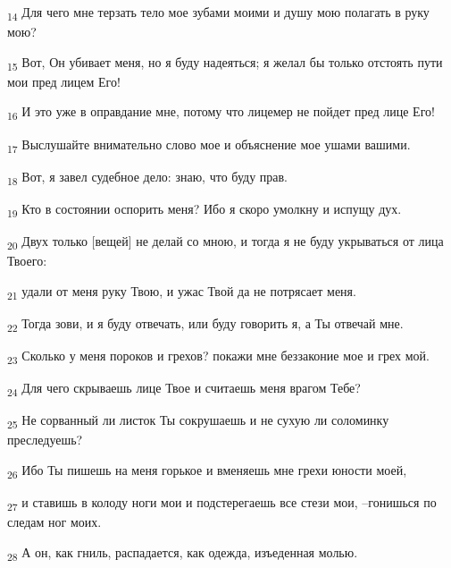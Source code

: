 \begin{tcolorbox}
\textsubscript{14} Для чего мне терзать тело мое зубами моими и душу мою полагать в руку мою?
\end{tcolorbox}
\begin{tcolorbox}
\textsubscript{15} Вот, Он убивает меня, но я буду надеяться; я желал бы только отстоять пути мои пред лицем Его!
\end{tcolorbox}
\begin{tcolorbox}
\textsubscript{16} И это уже в оправдание мне, потому что лицемер не пойдет пред лице Его!
\end{tcolorbox}
\begin{tcolorbox}
\textsubscript{17} Выслушайте внимательно слово мое и объяснение мое ушами вашими.
\end{tcolorbox}
\begin{tcolorbox}
\textsubscript{18} Вот, я завел судебное дело: знаю, что буду прав.
\end{tcolorbox}
\begin{tcolorbox}
\textsubscript{19} Кто в состоянии оспорить меня? Ибо я скоро умолкну и испущу дух.
\end{tcolorbox}
\begin{tcolorbox}
\textsubscript{20} Двух только [вещей] не делай со мною, и тогда я не буду укрываться от лица Твоего:
\end{tcolorbox}
\begin{tcolorbox}
\textsubscript{21} удали от меня руку Твою, и ужас Твой да не потрясает меня.
\end{tcolorbox}
\begin{tcolorbox}
\textsubscript{22} Тогда зови, и я буду отвечать, или буду говорить я, а Ты отвечай мне.
\end{tcolorbox}
\begin{tcolorbox}
\textsubscript{23} Сколько у меня пороков и грехов? покажи мне беззаконие мое и грех мой.
\end{tcolorbox}
\begin{tcolorbox}
\textsubscript{24} Для чего скрываешь лице Твое и считаешь меня врагом Тебе?
\end{tcolorbox}
\begin{tcolorbox}
\textsubscript{25} Не сорванный ли листок Ты сокрушаешь и не сухую ли соломинку преследуешь?
\end{tcolorbox}
\begin{tcolorbox}
\textsubscript{26} Ибо Ты пишешь на меня горькое и вменяешь мне грехи юности моей,
\end{tcolorbox}
\begin{tcolorbox}
\textsubscript{27} и ставишь в колоду ноги мои и подстерегаешь все стези мои, --гонишься по следам ног моих.
\end{tcolorbox}
\begin{tcolorbox}
\textsubscript{28} А он, как гниль, распадается, как одежда, изъеденная молью.
\end{tcolorbox}
